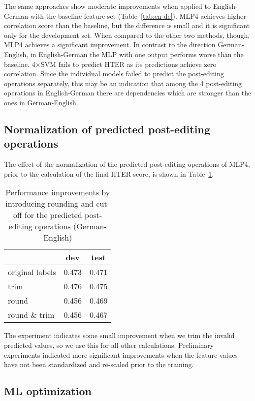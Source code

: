 \documentclass[11pt,letterpaper]{article}
\begin{document}
The same approaches show moderate improvements when applied to English-German
with the baseline feature set (Table~\ref{tab:en-de}).
MLP4 achieves higher correlation score than the baseline, but the difference is
small and it is significant only for the development set. When compared to the
other two methods, though, MLP4 achieves a significant improvement.
In contrast to the direction German-English, in English-German the MLP with one
output performs worse than the baseline.
4$\times$SVM fails to predict HTER as its predictions achieve zero correlation.
Since the individual models failed to predict the post-editing operations
separately, this may be an indication that among the 4 post-editing operations
in English-German there are dependencies which are stronger than the ones in
German-English.


\subsection{Normalization of predicted post-editing operations}

The effect of the normalization of the predicted post-editing operations of
MLP4, prior to the calculation of the final HTER score, is shown in
Table~\ref{tab:normalization}.

\begin{table}[ht]
\center
\begin{tabular}{lcc}
\toprule		
				& dev	& test   \\
\midrule
original labels	& 0.473	& 0.471 \\
trim 			& 0.476 & 0.475 \\
round			& 0.456	& 0.469 \\
round \& trim & 0.456 & 0.467 \\
\bottomrule
\end{tabular}
\caption{Performance improvements by introducing rounding and cut-off for the
predicted post-editing operations (German-English)}
\label{tab:normalization}
\end{table}

The experiment indicates some small improvement when we trim the invalid
predicted values, so we use this for all other calculations. Preliminary
experiments indicated more significant improvements when the feature values have
not been standardized and re-scaled prior to the training.


\subsection{ML optimization}
\end{document}
